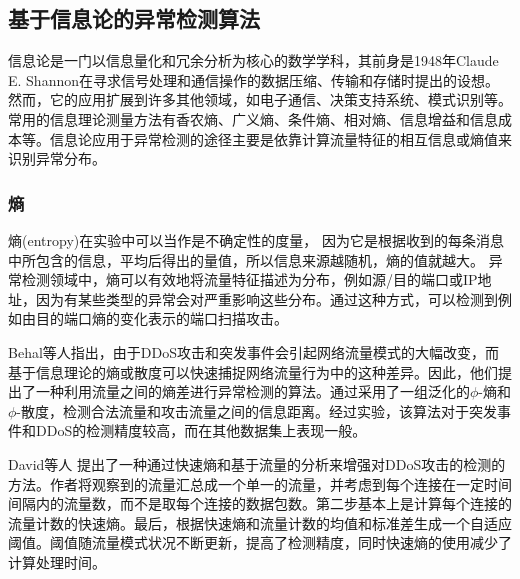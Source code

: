 

\subsection{基于信息论的异常检测算法}

信息论是一门以信息量化和冗余分析为核心的数学学科，其前身是1948年Claude E. Shannon在寻求信号处理和通信操作的数据压缩、传输和存储时提出的设想\cite{shannon1948mathematical}。然而，它的应用扩展到许多其他领域，如电子通信、决策支持系统、模式识别等。常用的信息理论测量方法有香农熵、广义熵、条件熵、相对熵、信息增益和信息成本等。信息论应用于异常检测的途径主要是依靠计算流量特征的相互信息或熵值来识别异常分布。

\subsubsection{熵}
熵(entropy)在实验中可以当作是不确定性的度量， 因为它是根据收到的每条消息中所包含的信息，平均后得出的量值，所以信息来源越随机，熵的值就越大。
异常检测领域中，熵可以有效地将流量特征描述为分布，例如源/目的端口或IP地址，因为有某些类型的异常会对严重影响这些分布。通过这种方式，可以检测到例如由目的端口熵的变化表示的端口扫描攻击。

Behal等人\cite{behal2017detection}指出，由于DDoS攻击和突发事件会引起网络流量模式的大幅改变，而基于信息理论的熵或散度可以快速捕捉网络流量行为中的这种差异。因此，他们提出了一种利用流量之间的熵差进行异常检测的算法。通过采用了一组泛化的$\phi$-熵和$\phi$-散度，检测合法流量和攻击流量之间的信息距离。经过实验，该算法对于突发事件和DDoS的检测精度较高，而在其他数据集上表现一般。

David等人\cite{david2015ddos} 提出了一种通过快速熵和基于流量的分析来增强对DDoS攻击的检测的方法。作者将观察到的流量汇总成一个单一的流量，并考虑到每个连接在一定时间间隔内的流量数，而不是取每个连接的数据包数。第二步基本上是计算每个连接的流量计数的快速熵。最后，根据快速熵和流量计数的均值和标准差生成一个自适应阈值。阈值随流量模式状况不断更新，提高了检测精度，同时快速熵的使用减少了计算处理时间。


